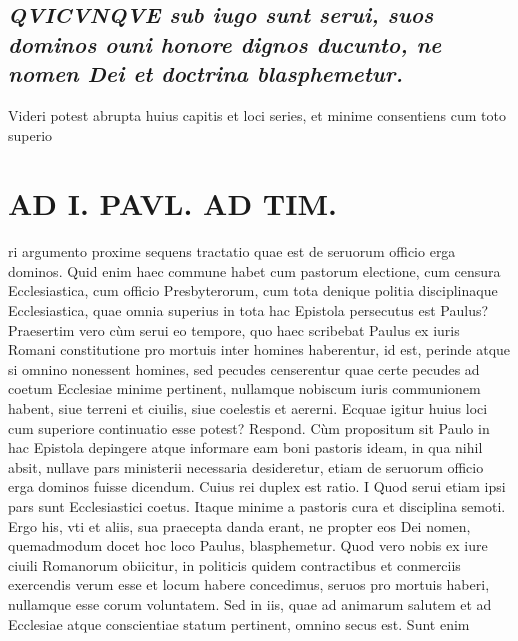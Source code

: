 \documentclass{article}
\begin{document}
\begin{pages}
\subsection*{\textit{\huge\textbf{Q}\normalsize VICVNQVE sub iugo sunt serui, suos dominos ouni honore dignos ducunto, ne nomen Dei et doctrina blasphemetur. }}\pstart Videri potest abrupta huius capitis et loci series, et minime consentiens cum toto superio\pend
{}
{}
\subsection*{\textit{}}
\section*{AD I. PAVL. AD TIM. }
\marginpar{[ p.410 ]}\pstart ri argumento proxime sequens tractatio quae est de seruorum officio erga dominos. Quid enim haec commune habet cum pastorum electione, cum censura Ecclesiastica, cum officio Presbyterorum, cum tota denique politia disciplinaque Ecclesiastica, quae omnia superius in tota hac Epistola persecutus est Paulus? Praesertim vero cùm serui eo tempore, quo haec scribebat Paulus ex iuris Romani constitutione pro mortuis inter homines haberentur, id est, perinde atque si omnino nonessent homines, sed pecudes censerentur quae certe pecudes ad coetum Ecclesiae minime pertinent, nullamque nobiscum iuris communionem habent, siue terreni et ciuilis, siue coelestis et aererni. Ecquae igitur huius loci cum superiore continuatio esse potest? Respond. Cùm propositum sit Paulo in hac Epistola depingere atque  informare eam boni pastoris ideam, in qua nihil absit, nullave pars ministerii necessaria desideretur, etiam de seruorum officio erga dominos fuisse dicendum. Cuius rei duplex est ratio.  \pend\pstart I Quod serui etiam ipsi pars sunt Ecclesiastici coetus. Itaque minime a pastoris cura et disciplina semoti. Ergo his, vti et aliis, sua praecepta danda erant, ne propter eos Dei nomen, quemadmodum docet hoc loco Paulus, blasphemetur. Quod vero nobis ex iure ciuili Romanorum obiicitur, in politicis quidem contractibus et conmerciis exercendis verum esse et locum habere concedimus, seruos pro mortuis haberi, nullamque  esse corum voluntatem. Sed in iis, quae ad animarum salutem et ad Ecclesiae atque conscientiae statum pertinent, omnino secus est. Sunt enim  \pend

\end{pages}
\end{document}
